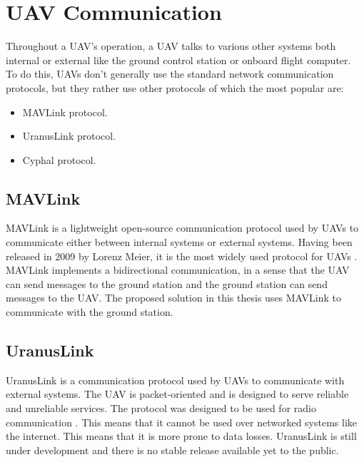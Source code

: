 
\section{UAV Communication}
\label{sec:uav-communication}

Throughout a UAV's operation, a UAV talks to various other systems both internal or external like the ground control station or onboard flight computer. To do this, UAVs don't generally use the standard network communication protocols, but they rather use other protocols of which the most popular are:

\begin{itemize}
    \item MAVLink protocol.
    \item UranusLink protocol.
    \item Cyphal protocol.
\end{itemize}

\subsection{MAVLink}
\label{subsec:mavlink}

MAVLink is a lightweight open-source communication protocol used by UAVs to communicate either between internal systems or external systems. Having been released in 2009 by Lorenz Meier, it is the most widely used protocol for UAVs \cite{mavlinkdocumentation}. MAVLink implements a bidirectional communication, in a sense that the UAV can send messages to the ground station and the ground station can send messages to the UAV. The proposed solution in this thesis uses MAVLink to communicate with the ground station.

\subsection{UranusLink}
\label{subsec:uranuslink}

UranusLink is a communication protocol used by UAVs to communicate with external systems. The UAV is packet-oriented and is designed to serve reliable and unreliable services. The protocol was designed to be used for radio communication \cite{Kriz2015}. This means that it cannot be used over networked systems like the internet. This means that it is more prone to data losses. UranusLink is still under development and there is no stable release available yet to the public.

